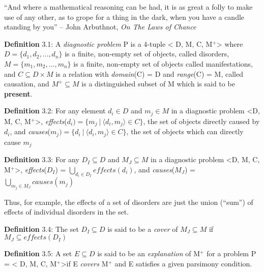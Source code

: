 \documentclass{article}
\begin{document}
``And where a mathematical reasoning can be had, it is as great a folly to make
use of any other, as to grope for a thing in the dark, when you have a candle
standing by you'' -- John Arbuthnot, \textit{On The Laws of Chance}
\newline

\par 

\textbf{Definition} 3.1: A \textit{diagnostic problem} P is a 4-tuple \textless
D, M, C, M$^{+}$\textgreater {} where $D = \{d_1, d_2, \ldots, d_n\}$ is a finite,
non-empty set of objects, called disorders, $M = \{m_1, m_2, \ldots, m_n\}$ is a
finite, non-empty set of objects called manifestations, and $C \subseteq D
\times M$ is a relation with \textit{domain}(C) = D and \textit{range}(C) = M,
called causation, and $M^{+} \subseteq M$ is a distinguished subset of M which is said to be
\textbf{present}.
\newline

\par 
\textbf{Definition} 3.2: For any element $d_i \in D$ and $m_j \in M$ in a
diagnostic problem \textless D, M, C, M$^{+}$\textgreater,
\textit{effects}($d_i) = \{ m_j\:|\:\langle d_i, m_j\rangle \in C\}$, the set
of objects directly caused by $d_i$, and 
\textit{causes}($m_j) = \{ d_i\:|\:\langle d_i, m_j\rangle \in C\}$, the set of
objects which can directly cause $m_j$
\newline

\par 
\textbf{Definition} 3.3: For any $D_I \subseteq D$ and $M_J \subseteq M$ in a
diagnostic problem \textless D, M, C, M$^{+}$\textgreater,
\textit{effects}($D_I$) = $\bigcup\limits_{d_i \in D_I} effects(d_i)$, and
\textit{causes}($M_J$) = $\bigcup\limits_{m_j \in M_J} causes(m_j)$
\newline
\par 
Thus, for example, the effects of a set of disorders are just the union
(``sum'') of effects of individual disorders in the set.
\newline

\par 
\textbf{Definition} 3.4: The set $D_I \subseteq D$ is said to be a
\textit{cover} of $M_J \subseteq M$ if $M_J \subseteq effects(D_I)$
\newline

\par 
\textbf{Definition} 3.5: A set $E \subseteq D$ is said to be an
\textit{explanation} of M$^{+}$ for a problem P = \textless
D, M, C, M$^{+}$\textgreater if E \textit{covers} M$^{+}$ and E satisfies a
given parsimony condition.
\newline
\end{document}
